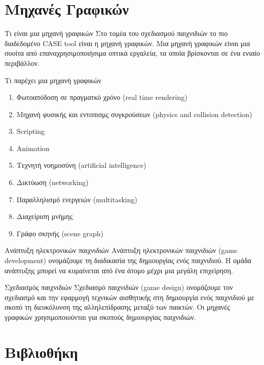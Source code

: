 \documentclass{beamer}
\begin{document}
	\section{Mηχανές Γραφικών}	
	\begin{frame}{Τι είναι μια μηχανή γραφικών}		
		Στο τομέα του σχεδιασμού παιχνιδιών το πιο διαδεδομένο CASE tool είναι η \alert{μηχανή γραφικών}. Μια μηχανή γραφικών είναι μια σουίτα από επαναχρησιμοποιήσιμα οπτικά εργαλεία, τα οποία βρίσκονται σε ένα ενιαίο περιβάλλον. \cite{gregory2009game}
	\end{frame}
	
	\begin{frame}{Τι παρέχει μια μηχανή γραφικών}		
	\begin{enumerate}
		\item Φωτοαπόδοση σε πραγματκό χρόνο (real time rendering)
		\item Mηχανή φυσικής και εντοπισμς συγκρούσεων (physics and collision detection)
		\item Scripting
		\item Animation
		\item Τεχνητή νοημοσύνη (artificial intelligence)
		\item Δικτύωση (networking)
		\item Παραλληλισμό ενεργειών (multitasking)
		\item Διαχείριση μνήμης
		\item Γράφο σκηνής (scene graph)
	\end{enumerate}
	\end{frame}
		
	\begin{frame}{Ανάπτυξη ηλεκτρονικών παιχνιδιών}
		Ανάπτυξη ηλεκτρονικών παιχνιδιών (game development) ονομάζουμε τη διαδικασία της δημιουργίας ενός παιχνιδιού. Η ομάδα ανάπτυξης μπορεί να κυμαίνεται από ένα άτομο μέχρι μια μεγάλη επιχείρηση.	
	\end{frame}
	
	\begin{frame}{Σχεδιασμός παιχνιδιών}
		Σχεδιασμό παιχνιδιών (game design) ονομάζουμε τον σχεδιασμό και την εφαρμογή τεχνικών αισθητικής στη δημιουργία ενός παιχνιδιού με σκοπό τη διευκόλυνση της αλληλεπίδρασης μεταξύ των παικτών. Οι μηχανές γραφικών χρησιμοποιούνται για σκοπούς δημιουργίας παιχνιδιών.
	\end{frame}
	
	\section{Bιβλιοθήκη}
		
\end{document}
